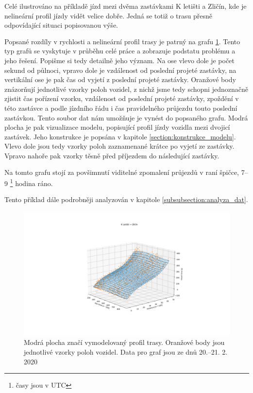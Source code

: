 Celé ilustrováno na příkladě jízd mezi dvěma zastávkami K letišti a Zličín, kde je nelineární profil jízdy vidět velice dobře. Jedná se totiž o trasu přesně odpovídající situaci popisovanou výše.

\bigbreak

Popsané rozdíly v rychlosti a nelineární profil trasy je patrný na grafu \ref{fig:k_letisti_to_zlicin_3d}. Tento typ grafů se vyskytuje v průběhu celé práce a zobrazuje podstatu problému a jeho řešení. Popišme si tedy detailně jeho význam. Na ose vlevo dole je počet sekund od půlnoci, vpravo dole je vzdálenost od poslední projeté zastávky, na vertikální ose je pak čas od vyjetí z poslední projeté zastávky. Oranžové body znázorňují jednotlivé vzorky poloh vozidel, z nichž jsme tedy schopni jednoznačně zjistit čas pořízení vzorku, vzdálenost od poslední projeté zastávky, zpoždění v této zastávce a podle jízdního řádu i čas pravidelného průjezdu touto poslední zastávkou. Tento soubor dat nám umožňuje je vynést do popsaného grafu. Modrá plocha je pak vizualizace modelu, popisující profil jízdy vozidla mezi dvojicí zastávek. Jeho konstrukce je popsána v kapitole \ref{section:konstrukce_modelu}. Vlevo dole jsou tedy vzorky poloh zaznamenané krátce po vyjetí ze zastávky. Vpravo nahoře pak vzorky těsně před příjezdem do následující zastávky.

\bigbreak

Na tomto grafu stojí za povšimnutí viditelné zpomalení průjezdů v raní špičce, 7--9 \footnote{časy jsou v UTC} hodina ráno.

\bigbreak

Tento příklad dále podrobněji analyzován v kapitole \ref{subsubsection:analyza_dat}.

\begin{figure}
  \includegraphics[width=\linewidth]{../img/k_letisti_to_zlicin_3d.png}
  \caption{Modrá plocha značí vymodelovaný profil trasy. Oranžové body jsou jednotlivé vzorky poloh vozidel. Data pro graf jsou ze dnů 20.--21. 2. 2020}
  \label{fig:k_letisti_to_zlicin_3d}
\end{figure}

